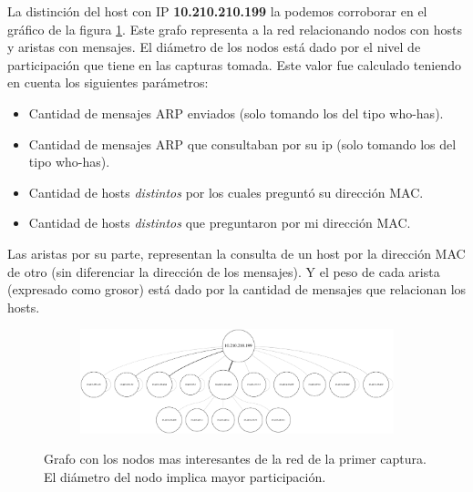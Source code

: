 \par La distinción del host con IP \textbf{10.210.210.199} la podemos corroborar en el gráfico de la figura \ref{fig:exp1_labo_grafo}. Este grafo representa a la red relacionando nodos con hosts y aristas con mensajes. El diámetro de los nodos está dado por el nivel de participación que tiene en las capturas tomada. Este valor fue calculado teniendo en cuenta los siguientes parámetros:
\begin{itemize}
	\item Cantidad de mensajes ARP enviados (solo tomando los del tipo who-has).
	\item Cantidad de mensajes ARP que consultaban por su ip (solo tomando los del tipo who-has).
	\item Cantidad de hosts \textit{distintos} por los cuales preguntó su dirección MAC.
	\item Cantidad de hosts \textit{distintos} que preguntaron por mi dirección MAC.
\end{itemize}
\par Las aristas por su parte, representan la consulta de un host por la dirección MAC de otro (sin diferenciar la dirección de los mensajes). Y el peso de cada arista (expresado como grosor) está dado por la cantidad de mensajes que relacionan los hosts.

\begin{figure}[ht]
  \hspace*{-0.5cm}
  \begin{subfigure}[b]{1.1\textwidth}
    \includegraphics[width=\textwidth]{imagenes/laboratorio/grafo_10.png}
  \end{subfigure}
	\label{fig:exp1_labo_grafo}
	\caption{Grafo con los nodos mas interesantes de la red de la primer captura. El diámetro del nodo implica mayor participación.}
\end{figure}
